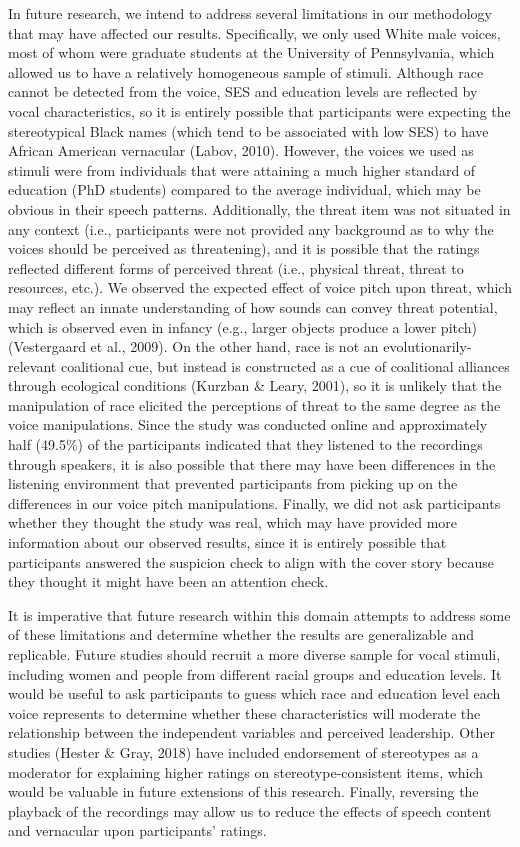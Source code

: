 \documentclass[
  english,
  man]{apa6}
\begin{document}
In future research, we intend to address several limitations in our methodology that may have affected our results. Specifically, we only used White male voices, most of whom were graduate students at the University of Pennsylvania, which allowed us to have a relatively homogeneous sample of stimuli. Although race cannot be detected from the voice, SES and education levels are reflected by vocal characteristics, so it is entirely possible that participants were expecting the stereotypical Black names (which tend to be associated with low SES) to have African American vernacular (Labov, 2010). However, the voices we used as stimuli were from individuals that were attaining a much higher standard of education (PhD students) compared to the average individual, which may be obvious in their speech patterns. Additionally, the threat item was not situated in any context (i.e., participants were not provided any background as to why the voices should be perceived as threatening), and it is possible that the ratings reflected different forms of perceived threat (i.e., physical threat, threat to resources, etc.). We observed the expected effect of voice pitch upon threat, which may reflect an innate understanding of how sounds can convey threat potential, which is observed even in infancy (e.g., larger objects produce a lower pitch) (Vestergaard et al., 2009). On the other hand, race is not an evolutionarily-relevant coalitional cue, but instead is constructed as a cue of coalitional alliances through ecological conditions (Kurzban \& Leary, 2001), so it is unlikely that the manipulation of race elicited the perceptions of threat to the same degree as the voice manipulations. Since the study was conducted online and approximately half (49.5\%) of the participants indicated that they listened to the recordings through speakers, it is also possible that there may have been differences in the listening environment that prevented participants from picking up on the differences in our voice pitch manipulations. Finally, we did not ask participants whether they thought the study was real, which may have provided more information about our observed results, since it is entirely possible that participants answered the suspicion check to align with the cover story because they thought it might have been an attention check.

It is imperative that future research within this domain attempts to address some of these limitations and determine whether the results are generalizable and replicable. Future studies should recruit a more diverse sample for vocal stimuli, including women and people from different racial groups and education levels. It would be useful to ask participants to guess which race and education level each voice represents to determine whether these characteristics will moderate the relationship between the independent variables and perceived leadership. Other studies (Hester \& Gray, 2018) have included endorsement of stereotypes as a moderator for explaining higher ratings on stereotype-consistent items, which would be valuable in future extensions of this research. Finally, reversing the playback of the recordings may allow us to reduce the effects of speech content and vernacular upon participants' ratings.
\end{document}
